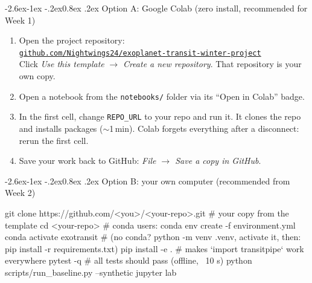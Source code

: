 \documentclass[11pt,a4paper]{article}
\makeatletter
\renewcommand\subsection{\@startsection{subsection}{2}{\z@}%
  {-2.6ex\@plus -1ex \@minus -.2ex}{0.8ex \@plus .2ex}%
  {\normalfont\sffamily\Large\bfseries\color{navy}}}
\newenvironment{code}%
 {\par\smallskip\noindent{\color{codeline}\rule{\linewidth}{0.6pt}}\par\vspace{-0.9\baselineskip}\verbatim}%
 {\endverbatim\vspace{-0.6\baselineskip}\noindent{\color{codeline}\rule{\linewidth}{0.6pt}}\par\smallskip}
\makeatother
\begin{document}
\subsection{Option A: Google Colab (zero install, recommended for Week 1)}
\begin{enumerate}
  \item Open the project repository:\\
        \href{https://github.com/Nightwings24/exoplanet-transit-winter-project}{\texttt{github.com/Nightwings24/exoplanet-transit-winter-project}}\\
        Click \emph{Use this template} \(\to\) \emph{Create a new repository}. That repository is your own copy.
  \item Open a notebook from the \texttt{notebooks/} folder via its ``Open in Colab'' badge.
  \item In the first cell, change \texttt{REPO\_URL} to your repo and run it. It clones the repo and installs packages
        (\(\sim\)1\,min). Colab forgets everything after a disconnect: rerun the first cell.
  \item Save your work back to GitHub: \emph{File \(\to\) Save a copy in GitHub}.
\end{enumerate}

\subsection{Option B: your own computer (recommended from Week 2)}
\begin{code}
git clone https://github.com/<you>/<your-repo>.git   # your copy from the template
cd <your-repo>
# conda users:
conda env create -f environment.yml
conda activate exotransit
# (no conda? python -m venv .venv, activate it, then: pip install -r requirements.txt)
pip install -e .                         # makes `import transitpipe` work everywhere
pytest -q                                # all tests should pass (offline, ~10 s)
python scripts/run_baseline.py --synthetic
jupyter lab
\end{code}
\end{document}
